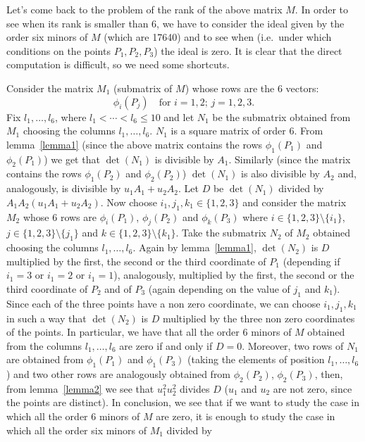 \documentclass{amsart}
\theoremstyle{plain}
\theoremstyle{definition}
\begin{document}
Let's come back to the problem of the rank of the above matrix $M$.
In order to see when its rank is smaller than $6$, we
have to consider the ideal given by the order six minors of
$M$ (which are 17640) and to see when (i.e.\ under which conditions on
the points $P_1, P_2, P_3$) the ideal is zero. It is clear that the
direct computation is difficult, so we need some shortcuts.

Consider the matrix $M_1$ (submatrix of $M$) whose rows are the $6$ vectors:
\[
\phi_i(P_j) \quad \mbox{for $i = 1, 2$;\ \ $j=1, 2, 3$}.
\]
Fix $l_1, \dots, l_6$, where $l_1 < \cdots < l_6 \leq 10$ and let $N_1$
be the submatrix obtained from $M_1$ choosing the columns
$l_1, \dots, l_6$. $N_1$ is a square matrix of order $6$. 
{From} lemma~\ref{lemma1}
(since the above matrix contains the rows $\phi_1(P_1)$ and
$\phi_2(P_1)$) we get that $\det(N_1)$ is divisible by $A_1$. Similarly
(since the matrix contains the rows $\phi_1(P_2)$ and $\phi_2(P_2)$)
$\det(N_1)$ is also divisible by $A_2$ and, analogously, is divisible by
$u_1A_1+u_2A_2$. Let $D$ be $\det(N_1)$ divided by
$A_1A_2(u_1A_1+u_2A_2)$. Now choose $i_1, j_1, k_1 \in \{1, 2, 3\}$ and
consider the matrix
$M_2$ whose $6$ rows are $\phi_i(P_1)$, $\phi_j(P_2)$ and $\phi_k(P_3)$
where $i \in \{1, 2, 3\} \setminus \{i_1\}$, $j \in \{1, 2, 3\}\setminus
  \{j_1\}$ and $k \in \{1, 2, 3\} \setminus \{ k_1\}$. Take the submatrix
$N_2$ of $M_2$ obtained choosing the columns $l_1, \dots, l_6$. 
Again by lemma~\ref{lemma1}, $\det(N_2)$ is $D$ 
multiplied by the first, the second or the third coordinate of $P_1$
(depending if $i_1=3$ or $i_1=2$ or $i_1=1$), analogously,
multiplied by the first, the second or the third coordinate of $P_2$ and
of $P_3$ (again depending on the value of $j_1$ and $k_1$).
Since each of the three points have a non zero
coordinate, we can choose $i_1, j_1, k_1$ in such a way that
$\det(N_2)$ is $D$ multiplied by the
three non zero coordinates of the points. In particular, 
we have that all the order $6$ minors of $M$ obtained
from the columns $l_1, \dots, l_6$ are zero if and only if $D=0$.
Moreover, two rows of $N_1$
are obtained from $\phi_1(P_1)$ and $\phi_1(P_3)$ (taking the elements
of position $l_1, \dots, l_6$) and two other rows are analogously obtained
from $\phi_2(P_2)$, $\phi_2(P_3)$, then, from lemma~\ref{lemma2} we see that
$u_1^2u_2^2$ divides $D$ ($u_1$ and $u_2$
are not zero, since the points are distinct).
In conclusion, we see that if we want to study the case in which all the
order $6$ minors of $M$ are zero, it is enough to study the case in
which all the order six minors of $M_1$ divided by
\end{document}
